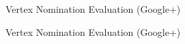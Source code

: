 \documentclass[xcolor=dvipsnames]{beamer}
\begin{document}
\begin{frame}{Vertex Nomination Evaluation (Google+)}
\begin{figure}
\end{figure}
\end{frame}

\begin{frame}{Vertex Nomination Evaluation (Google+)}
\begin{figure}
\end{figure}
\end{frame}
\end{document}
